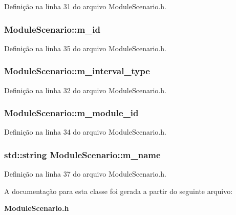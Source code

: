 Definição na linha 31 do arquivo Module\+Scenario.\+h.

\subsubsection[{m\+\_\+id}]{ Module\+Scenario\+::m\+\_\+id\hspace{0.3cm}{\ttfamily [protected]}}\label{class_module_scenario_ab50968d5675cecc5b67fe3a188fa54b2}


Definição na linha 35 do arquivo Module\+Scenario.\+h.

\subsubsection[{m\+\_\+interval\+\_\+type}]{ Module\+Scenario\+::m\+\_\+interval\+\_\+type\hspace{0.3cm}{\ttfamily [protected]}}\label{class_module_scenario_a3f6607d3365865fab231a1585c2cd004}


Definição na linha 32 do arquivo Module\+Scenario.\+h.

\subsubsection[{m\+\_\+module\+\_\+id}]{ Module\+Scenario\+::m\+\_\+module\+\_\+id\hspace{0.3cm}{\ttfamily [protected]}}\label{class_module_scenario_a96c29f6cac31eaba6aea07b1c272a8e5}


Definição na linha 34 do arquivo Module\+Scenario.\+h.

\subsubsection[{m\+\_\+name}]{\setlength{\rightskip}{0pt plus 5cm}std\+::string Module\+Scenario\+::m\+\_\+name\hspace{0.3cm}{\ttfamily [protected]}}\label{class_module_scenario_aece3aaac1f3b77d95e496d5adcb2db7d}


Definição na linha 37 do arquivo Module\+Scenario.\+h.



A documentação para esta classe foi gerada a partir do seguinte arquivo\+:\begin{DoxyCompactItemize}
\item 
{\bf Module\+Scenario.\+h}\end{DoxyCompactItemize}
